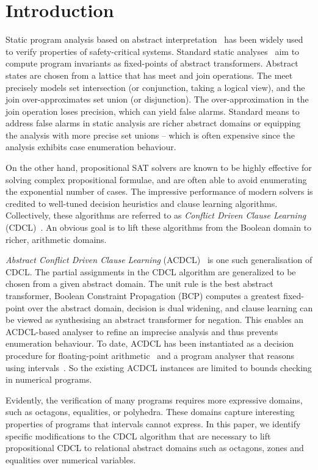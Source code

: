 \section{Introduction}

%
Static program analysis based on abstract interpretation~\cite{CC77, 
DBLP:conf/pldi/BlanchetCCFMMMR03} has been widely used to 
verify properties of safety-critical systems.
Standard static analyses~\cite{se2011} aim to compute program invariants as
fixed-points of abstract transformers.  Abstract states are chosen from a
lattice that has meet and join operations.  The meet precisely models set
intersection (or conjunction, taking a logical view), and the join
over-approximates set union (or disjunction).  The over-approximation in the
join operation loses precision, which can yield false
alarms.  Standard means to address false alarms in static analysis are 
richer abstract domains or equipping the analysis with more precise set
unions -- which is often expensive since the analysis exhibits case
enumeration behaviour.

%
On the other hand, propositional SAT solvers are known to be highly
effective for solving complex propositional formulae, and are often
able to avoid enumerating the exponential number of cases.  The impressive
performance of modern solvers is credited to well-tuned decision heuristics
and clause learning algorithms.  Collectively, these
algorithms are referred to as \emph{Conflict Driven Clause Learning}
(CDCL)~\cite{cdcl}. An obvious goal is to lift these algorithms from the Boolean
domain to richer, arithmetic domains.

\emph{Abstract Conflict Driven Clause Learning} (ACDCL)~\cite{dhk2013-popl}
is one such generalisation of CDCL.  The partial assignments in
the CDCL algorithm are generalized to be chosen from a given abstract domain. 
The unit rule is the best abstract transformer, Boolean Constraint
Propagation (BCP) computes a greatest fixed-point over the abstract domain,
decision is dual widening, and clause learning can be viewed as synthesising
an abstract transformer for negation.  This enables an ACDCL-based analyser
to refine an imprecise analysis and thus prevents enumeration behaviour. 
To date, ACDCL has been instantiated as a decision procedure for
floating-point arithmetic~\cite{DBLP:journals/fmsd/BrainDGHK14} and a
program analyser that reasons using intervals~\cite{tacas12}.  So the
existing ACDCL instances are limited to bounds checking in numerical
programs.

Evidently, the verification of many programs requires more expressive
domains, such as octagons, equalities, or polyhedra.  These domains capture
interesting properties of programs that intervals cannot express.  In this
paper, we identify specific modifications to the CDCL algorithm that are
necessary to lift propositional CDCL to relational abstract domains such as
octagons, zones and equalities over numerical variables.
